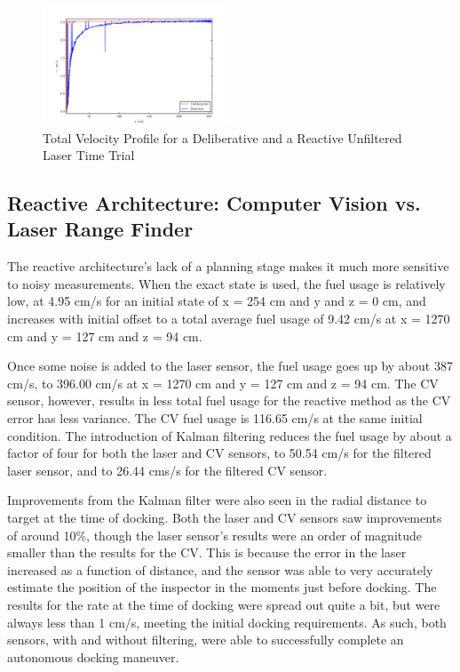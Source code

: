 \documentclass[journal, 10pt]{IEEEtran}
\begin{document}
\begin{figure}[tb]
\begin{center}
\includegraphics[width=0.5\textwidth]{figures/TotalVelocityNoisy.pdf}
\caption{Total Velocity Profile for a Deliberative and a Reactive Unfiltered Laser Time Trial }
\label{noisy_total}
\end{center}
\end{figure}

\subsection{Reactive Architecture: Computer Vision vs. Laser Range Finder}
The reactive architecture's lack of a planning stage makes it much more sensitive to noisy measurements. When the exact state is used, the fuel usage is relatively low, at 4.95 cm/s for an initial state of x = 254 cm and y and z = 0 cm, and increases with initial offset to a total average fuel usage of 9.42 cm/s at x = 1270 cm and y = 127 cm and z = 94 cm.

Once some noise is added to the laser sensor, the fuel usage goes up by about 387 cm/s, to 396.00 cm/s at x = 1270 cm and y = 127 cm and z = 94 cm. The CV sensor, however, results in less total fuel usage for the reactive method as the CV error has less variance. The CV fuel usage is 116.65 cm/s at the same initial condition. The introduction of Kalman filtering reduces the fuel usage by about a factor of four for both the laser and CV sensors, to 50.54 cm/s for the filtered laser sensor, and to 26.44 cms/s for the filtered CV sensor.

Improvements from the Kalman filter were also seen in the radial distance to target at the time of docking. Both the laser and CV sensors saw improvements of around 10\%, though the laser sensor's results were an order of magnitude smaller than the results for the CV. This is because the error in the laser increased as a function of distance, and the sensor was able to very accurately estimate the position of the inspector in the moments just before docking. The results for the rate at the time of docking were spread out quite a bit, but were always less than 1 cm/s, meeting the initial docking requirements. As such, both sensors, with and without filtering, were able to successfully complete an autonomous docking maneuver.
\end{document}
